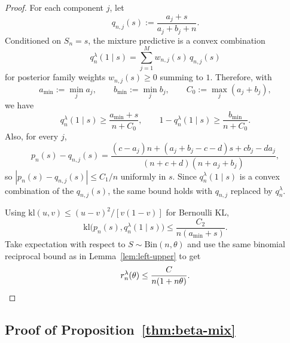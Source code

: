 \documentclass{article}
\theoremstyle{definition}
\theoremstyle{remark}
\newcommand{\Bin}{\mathrm{Bin}}
\newcommand{\klb}{\mathrm{kl}}
\begin{document}
\begin{proof}
For each component $j$, let
\[
q_{n,j}(s):=\frac{a_j+s}{a_j+b_j+n}.
\]
Conditioned on $S_n=s$, the mixture predictive is a convex combination
\[
q_n^\lambda(1\mid s)=\sum_{j=1}^M w_{n,j}(s)\,q_{n,j}(s)
\]
for posterior family weights $w_{n,j}(s)\ge 0$ summing to $1$. Therefore, with
\[
a_{\min}:=\min_j a_j,
\qquad
b_{\min}:=\min_j b_j,
\qquad
C_0:=\max_j(a_j+b_j),
\]
we have
\[
q_n^\lambda(1\mid s)\ge \frac{a_{\min}+s}{n+C_0},
\qquad
1-q_n^\lambda(1\mid s)\ge \frac{b_{\min}}{n+C_0}.
\]
Also, for every $j$,
\[
p_n(s)-q_{n,j}(s)
=
\frac{(c-a_j)n + (a_j+b_j-c-d)s + cb_j-da_j}
{(n+c+d)(n+a_j+b_j)},
\]
so $|p_n(s)-q_{n,j}(s)|\le C_1/n$ uniformly in $s$. Since $q_n^\lambda(1\mid s)$ is a convex combination of the $q_{n,j}(s)$, the same bound holds with $q_{n,j}$ replaced by $q_n^\lambda$.

Using $\klb(u,v)\le (u-v)^2/[v(1-v)]$ for Bernoulli KL,
\[
\klb\bigl(p_n(s),q_n^\lambda(1\mid s)\bigr)
\le
\frac{C_2}{n(a_{\min}+s)}.
\]
Take expectation with respect to $S\sim \Bin(n,\theta)$ and use the same binomial reciprocal bound as in Lemma~\ref{lem:left-upper} to get
\[
r_n^\lambda(\theta)\le \frac{C}{n(1+n\theta)}.
\qedhere
\]
\end{proof}

\subsection{Proof of Proposition~\ref{thm:beta-mix}}
\end{document}
